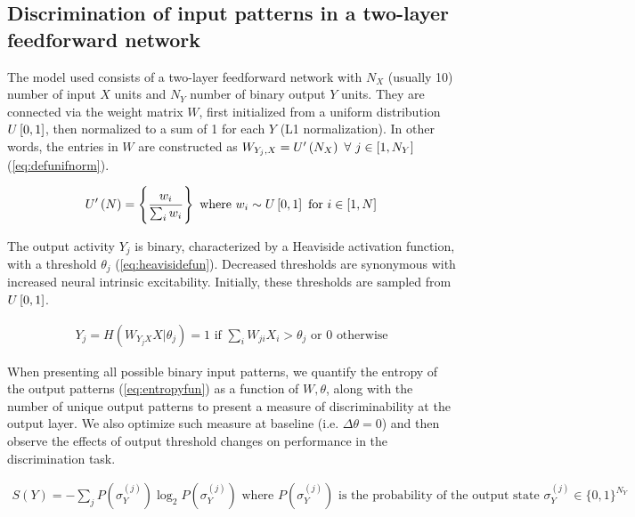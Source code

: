 \subsection{Discrimination of input patterns in a two-layer feedforward network}

The model used consists of a two-layer feedforward network
        with $N_X$ (usually 10) number of input $X$ units
        and $N_Y$ number of binary output $Y$ units.
    They are connected via the weight matrix $W$,
        first initialized from a uniform distribution $U\left[0,1\right]$,
        then normalized to a sum of 1 for each $Y$ (L1 normalization).
    In other words, the entries in $W$ are constructed as
        $W_{Y_j,X} = U^{\prime}\left(N_X\right) \ \forall \ j \in [1, N_Y]$
        (\autoref{eq:defunifnorm}).

\vspace{-1em}
\begin{align}
    U^{\prime}\left(N\right) = \left\{
            \dfrac{w_i}{\sum_i w_i}
            \right\}
        \text{ where } w_i \sim U\left[0,1\right]
        \text{ for }
        i \in [1, N]
    \label{eq:defunifnorm}
\end{align}

The output activity $Y_j$ is binary,
        characterized by a Heaviside activation function,
        with a threshold $\theta_j$ (\autoref{eq:heavisidefun}).
    Decreased thresholds are synonymous with increased neural intrinsic excitability.
    Initially, these thresholds are
        sampled from $U\left[0,1\right]$.

\vspace{-1em}
\begin{align}
    Y_j = H(W_{Y_j X} X | \theta_j) =
    1 \text{  if  } \sum_i W_{ji} X_i > \theta_j
    \text{ or } 0 \text{  otherwise}
    \label{eq:heavisidefun}
\end{align}

When presenting all possible binary input patterns,
        we quantify the entropy of the output patterns (\autoref{eq:entropyfun}) as a function of $W, \theta$,
        along with the number of unique output patterns
        to present a measure of discriminability at the output layer.
    We also optimize such measure at baseline (i.e. $\Delta \theta = 0$)
        and then observe the effects of output threshold changes on performance in the discrimination task.


\vspace{-1em}
\begin{align}
    S(Y) = - \sum_j
        P\left(\sigma_Y^{(j)}\right)
        \log_2 P\left(\sigma_Y^{(j)}\right)
    \text{ where } P\left(\sigma_Y^{(j)}\right)
    \text{ is the probability of the output state }
    \sigma_Y^{(j)} \in \{0,1\}^{N_Y}
    \label{eq:entropyfun}
\end{align}



